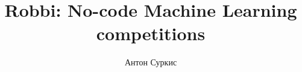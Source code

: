 \documentclass{beamer}
\title{Robbi: No-code Machine Learning competitions}
\author{Антон Суркис}
\begin{document}
\begin{frame}
\titlepage
\end{frame}





\end{document}
